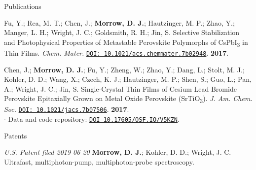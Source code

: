 \documentclass{resume} %
\begin{document}
\begin{rSection}{Publications}
\begin{etaremune}
\item Fu, Y.; Rea, M. T.; Chen, J.; \textbf{Morrow, D. J.}; Hautzinger, M. P.; Zhao, Y.; Manger, L. H.; Wright, J. C.; Goldsmith, R. H.; Jin, S. Selective Stabilization and Photophysical Properties of
Metastable Perovskite Polymorphs of CsPbI\textsubscript{3} in Thin Films. \emph{Chem. Mater.} \href{http://pubs.acs.org/doi/10.1021/acs.chemmater.7b02948}{\texttt{DOI: 10.1021/acs.chemmater.7b02948}}. \textbf{2017}. 
 
\item Chen, J.; \textbf{Morrow, D. J.}; Fu, Y.; Zheng, W.; Zhao, Y.; Dang, L.; Stolt, M. J.; Kohler, D. D.; Wang, X.; Czech, K. J.; Hautzinger, M. P.; Shen, S.; Guo, L.; Pan, A.; Wright, J. C.; Jin, S. Single-Crystal Thin Films of Cesium Lead Bromide Perovskite Epitaxially Grown on Metal Oxide Perovskite (SrTiO\textsubscript{3}). \emph{J. Am. Chem. Soc.} \href{http://pubs.acs.org/doi/10.1021/jacs.7b07506}{\texttt{DOI: 10.1021/jacs.7b07506}}. \textbf{2017}. \\
$\cdot$ Data and code repository: \href{https://osf.io/v5kzn/}{\texttt{DOI 10.17605/OSF.IO/V5KZN}}.
	


\end{etaremune}


\end{rSection}

\begin{rSection}{Patents}
	\begin{etaremune}
		\item \textit{U.S. Patent filed 2019-06-20} \textbf{Morrow, D. J.}; Kohler, D. D.; Wright, J. C. Ultrafast, multiphoton-pump, multiphoton-probe spectroscopy. 		
	\end{etaremune}	
\end{rSection}
\end{document}
